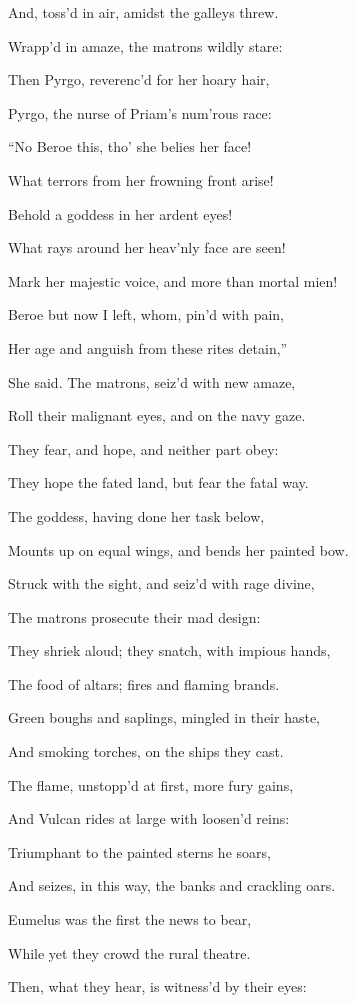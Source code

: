 And, toss’d in air, amidst the galleys threw.

Wrapp’d in amaze, the matrons wildly stare:

Then Pyrgo, reverenc’d for her hoary hair,

Pyrgo, the nurse of Priam’s num’rous race:

“No Beroe this, tho’ she belies her face!

What terrors from her frowning front arise!

Behold a goddess in her ardent eyes!

What rays around her heav’nly face are seen!

Mark her majestic voice, and more than mortal mien!

Beroe but now I left, whom, pin’d with pain,

Her age and anguish from these rites detain,”

She said. The matrons, seiz’d with new amaze,

Roll their malignant eyes, and on the navy gaze.

They fear, and hope, and neither part obey:

They hope the fated land, but fear the fatal way.

The goddess, having done her task below,

Mounts up on equal wings, and bends her painted bow.

Struck with the sight, and seiz’d with rage divine,

The matrons prosecute their mad design:

They shriek aloud; they snatch, with impious hands,

The food of altars; fires and flaming brands.

Green boughs and saplings, mingled in their haste,

And smoking torches, on the ships they cast.

The flame, unstopp’d at first, more fury gains,

And Vulcan rides at large with loosen’d reins:

Triumphant to the painted sterns he soars,

And seizes, in this way, the banks and crackling oars.

Eumelus was the first the news to bear,

While yet they crowd the rural theatre.

Then, what they hear, is witness’d by their eyes:

